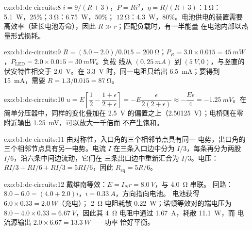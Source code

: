 \begin{solution}{exo:b1:dc-circuits:8}
$i = 9/(R + 3)$，$P = Ri^2$，$\eta = R/(R + 3)$：$\qty{1}{\ohm}$：
\qty{5.1}{W}，$25\%$；$\qty{3}{\ohm}$：\qty{6.75}{W}，$50\%$；
$\qty{12}{\ohm}$：\qty{4.3}{W}，$80\%$。电池供电的装置需要
高效率（延长电池寿命），因此 $R \gg r$；匹配负载时，有一半能量
在电池内部以热量形式损耗。
\end{solution}

\begin{solution}{exo:b1:dc-circuits:9}
$R = (5.0 - 2.0)/0.015 = \qty{200}{\ohm}$；$P_R = 3.0 \times 0.015 =
\qty{45}{mW}$，$P_{\mathrm{LED}} = 2.0 \times 0.015 = \qty{30}{mW}$。负载
线从 $(0, \qty{25}{mA})$ 到 $(\qty{5}{V}, 0)$，与竖直的
伏安特性相交于 \qty{2.0}{V}。在 \qty{3.3}{V} 时，同一电阻只给出
\qty{6.5}{mA}；要得到 \qty{15}{mA}，需要 $R = 1.3/0.015 =
\qty{87}{\ohm}$。
\end{solution}

\begin{solution}{exo:b1:dc-circuits:10}
$u = E\left[\dfrac12 - \dfrac{1 + \epsilon}{2 + \epsilon}\right] =
-E\dfrac{\epsilon}{2(2 + \epsilon)} \approx -\dfrac{E\epsilon}{4} =
\qty{-1.25}{mV}$。在简单分压器中，同样的变化叠加在
\qty{2.5}{V} 的偏置之上（\qty{2.50125}{V}）；电桥则在零附近输出
\qty{1.25}{mV}，可以放大一千倍而
不产生饱和。
\end{solution}

\begin{solution}{exo:b1:dc-circuits:11}
由对称性，入口角的三个相邻节点具有同一
电势，出口角的三个相邻节点具有另一电势。电流
$I$ 在三条入口边中分为 $I/3$，每条再分为两股
$I/6$，沿六条中间边流动，它们在
三条出口边中重新汇合为 $I/3$。电压：$RI/3 + RI/6 + RI/3 = 5RI/6$，因此
$R_{\mathrm{eq}} = 5R/6$。
\end{solution}

\begin{solution}{exo:b1:dc-circuits:12}
戴维南等效：$E = I_N r = \qty{8.0}{V}$，与 \qty{4.0}{\ohm} 串联。
回路：$8.0 - 6.0 = (4.0 + 2.0)i$，$i = \qty{0.33}{A}$，方向指向电池。
电池获得 $6.0 \times 0.33 = \qty{2.0}{W}$（充电）；
\qty{2}{\ohm} 电阻耗散 \qty{0.22}{W}；诺顿等效对的端电压为
$8.0 - 4.0 \times 0.33 = \qty{6.67}{V}$，因此其
\qty{4}{\ohm} 电阻中通过 \qty{1.67}{A}，耗散 \qty{11.1}{W}，而
电流源输出 $2.0 \times 6.67 = \qty{13.3}{W}$——功率
恰好平衡。
\end{solution}


